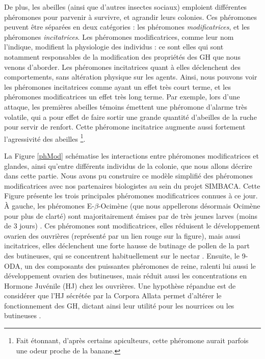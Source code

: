 			De plus, les abeilles (ainsi que d'autres insectes sociaux) emploient différentes phéromones pour parvenir à survivre, et agrandir leurs colonies. Ces phéromones peuvent être séparées en deux catégories : les phéromones \textit{modificatrices}, et les phéromones \textit{incitatrices}. Les phéromones modificatrices, comme leur nom l'indique, modifient la physiologie des individus : ce sont elles qui sont notamment responsables de la modification des propriétés des GH que nous venons d'aborder. Les phéromones incitatrices quant à elles déclenchent des comportements, sans altération physique sur les agents. Ainsi, nous pouvons voir les phéromones incitatrices comme ayant un effet très court terme, et les phéromones modificatrices un effet très long terme. Par exemple, lors d'une attaque, les premières abeilles témoins émettent une phéromone d'alarme très volatile, qui a pour effet de faire sortir une grande quantité d'abeilles de la ruche pour servir de renfort. Cette phéromone incitatrice augmente aussi fortement l'agressivité des abeilles \footnote{Fait étonnant, d'après certains apiculteurs, cette phéromone aurait parfois une odeur proche de la banane.}.
			
			La Figure \ref{phMod} schématise les interactions entre phéromones modificatrices et glandes, ainsi qu'entre différents individus de la colonie, que nous allons décrire dans cette partie. Nous avons pu construire ce modèle simplifié des phéromones modificatrices avec nos partenaires biologistes au sein du projet SIMBACA. Cette Figure présente les trois principales phéromones modificatrices connues à ce jour. À gauche, les phéromones E-$\beta$-Ocimène (que nous appellerons désormais Ocimène pour plus de clarté) sont majoritairement émises par de très jeunes larves (moins de 3 jours) \cite{maisonnasse_e-b-ocimene_2010}. Ces phéromones sont modificatrices, elles réduisent le développement ovarien des ouvrières (représenté par un lien rouge sur la figure), mais aussi incitatrices, elles déclenchent une forte hausse de butinage de pollen de la part des butineuses, qui se concentrent habituellement sur le nectar \cite{maisonnasse_e-b-ocimene_2010}. Ensuite, le 9-ODA, un des composants des puissantes phéromones de reine, ralenti lui aussi le développement ovarien des butineuses, mais réduit aussi les concentrations en Hormone Juvénile (HJ) chez les ouvrières. Une hypothèse répandue est de considérer que l'HJ sécrétée par la Corpora Allata permet d'altérer le fonctionnement des GH, dictant ainsi leur utilité pour les nourrices ou les butineuses \cite{robinson_colony_1998}.
			 
